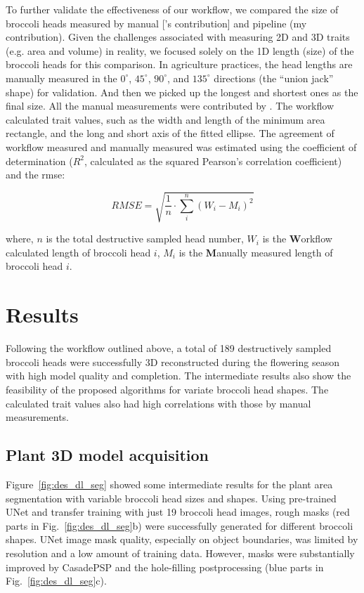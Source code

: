 To further validate the effectiveness of our workflow, we compared the size of broccoli heads measured by manual [\mbox{\citet{nishida_estimation_2023}}'s contribution] and pipeline (my contribution). Given the challenges associated with measuring 2D and 3D traits (e.g. area and volume) in reality, we focused solely on the 1D length (size) of the broccoli heads for this comparison. In agriculture practices, the head lengths are manually measured in the $0^\circ$, $45^\circ$, $90^\circ$, and $135^\circ$ directions (the ``union jack'' shape) for validation. And then we picked up the longest and shortest ones as the final size. All the manual measurements were contributed by \mbox{\citet{nishida_estimation_2023}.} The workflow calculated trait values, such as the width and length of the minimum area rectangle, and the long and short axis of the fitted ellipse. The agreement of workflow measured and manually measured was estimated using the coefficient of determination ($R^2$, calculated as the squared Pearson's correlation coefficient) and the \gls{rmse}:

\begin{equation}
  RMSE = \sqrt{\frac{1}{n} \cdot \sum_{i}^{n} (W_{i} - M_{i})^2}
\end{equation}

\noindent
where, $n$ is the total destructive sampled head number, $W_{i}$ is the \textbf{W}orkflow calculated length of broccoli head $i$, $M_{i}$ is the \textbf{M}anually measured length of broccoli head $i$.

\section{Results}

Following the workflow outlined above, a total of 189 destructively sampled broccoli heads were successfully 3D reconstructed during the flowering season with high model quality and completion. The intermediate results also show the feasibility of the proposed algorithms for variate broccoli head shapes. The calculated trait values also had high correlations with those by manual measurements.

\subsection{Plant 3D model acquisition}

Figure~\ref{fig:des_dl_seg} showed some intermediate results for the plant area segmentation with variable broccoli head sizes and shapes. Using pre-trained UNet and transfer training with just 19 broccoli head images, rough masks (red parts in Fig.~\ref{fig:des_dl_seg}b) were successfully generated for different broccoli shapes. UNet image mask quality, especially on object boundaries, was limited by resolution and a low amount of training data. However, masks were substantially improved by CasadePSP and the hole-filling postprocessing (blue parts in Fig.~\ref{fig:des_dl_seg}c).

